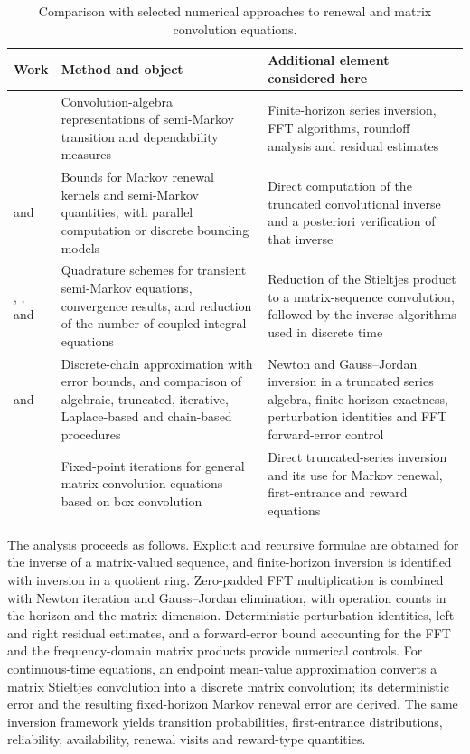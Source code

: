 \documentclass[3p,12pt,authoryear]{elsarticle}
\theoremstyle{definition}
\theoremstyle{remark}
\begin{document}
\begin{table}[H]
\centering
\small
\begin{tabularx}{\textwidth}{@{}L{0.19\textwidth}L{0.34\textwidth}X@{}}
\toprule
Work & Method and object & Additional element considered here\\
\midrule
\citet{Limnios1997} & Convolution-algebra representations of semi-Markov transition and dependability measures & Finite-horizon series inversion, FFT algorithms, roundoff analysis and residual estimates\\
\citet{ElkinsWortman2001} and \citet{Mercier2008} & Bounds for Markov renewal kernels and semi-Markov quantities, with parallel computation or discrete bounding models & Direct computation of the truncated convolutional inverse and a posteriori verification of that inverse\\
\citet{JanssenManca2001}, \citet{CorradiJanssenManca2004}, and \citet{MouraDroguett2010} & Quadrature schemes for transient semi-Markov equations, convergence results, and reduction of the number of coupled integral equations & Reduction of the Stieltjes product to a matrix-sequence convolution, followed by the inverse algorithms used in discrete time\\
\citet{WuMayaLimnios2021} and \citet{WuLimnios2024} & Discrete-chain approximation with error bounds, and comparison of algebraic, truncated, iterative, Laplace-based and chain-based procedures & Newton and Gauss--Jordan inversion in a truncated series algebra, finite-horizon exactness, perturbation identities and FFT forward-error control\\
\citet{KilicmanAlZhour2010} & Fixed-point iterations for general matrix convolution equations based on box convolution & Direct truncated-series inversion and its use for Markov renewal, first-entrance and reward equations\\
\bottomrule
\end{tabularx}
\caption{Comparison with selected numerical approaches to renewal and matrix convolution equations.}
\label{tab:comparison}
\end{table}

The analysis proceeds as follows. Explicit and recursive formulae are obtained for the inverse of a matrix-valued sequence, and finite-horizon inversion is identified with inversion in a quotient ring. Zero-padded FFT multiplication is combined with Newton iteration and Gauss--Jordan elimination, with operation counts in the horizon and the matrix dimension. Deterministic perturbation identities, left and right residual estimates, and a forward-error bound accounting for the FFT and the frequency-domain matrix products provide numerical controls. For continuous-time equations, an endpoint mean-value approximation converts a matrix Stieltjes convolution into a discrete matrix convolution; its deterministic error and the resulting fixed-horizon Markov renewal error are derived. The same inversion framework yields transition probabilities, first-entrance distributions, reliability, availability, renewal visits and reward-type quantities.
\end{document}
